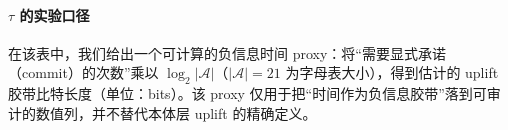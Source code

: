 \begin{table}[H]
\centering
\scriptsize
\setlength{\tabcolsep}{4pt}
\resizebox{\linewidth}{!}{}
\caption{HPA-CA/Fold6：固定点求解器（greedy 与 bounded backtracking）与 DFS 基线的对比摘要（成功率与成本）。所有数字由脚本生成并可一键复现。}
\label{tab:hpa_ca_bidirectional_fixed_point}
\end{table}

\paragraph{\texorpdfstring{\(\tau\)}{tau} 的实验口径}
在该表中，我们给出一个可计算的负信息时间 proxy：将“需要显式承诺（commit）的次数”乘以 \(\log_2|\mathcal A|\)（\(|\mathcal A|=21\) 为字母表大小），得到估计的 uplift 胶带比特长度（单位：bits）。该 proxy 仅用于把“时间作为负信息胶带”落到可审计的数值列，并不替代本体层 uplift 的精确定义。

